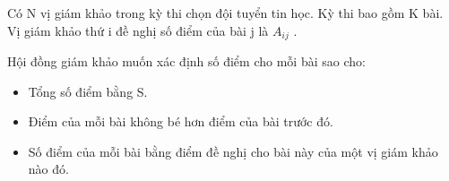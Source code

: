 Có N vị giám khảo trong kỳ thi chọn đội tuyển tin học. Kỳ thi bao gồm K bài. Vị giám khảo thứ i đề nghị số điểm của bài j là $A_{ij}$ .

Hội đồng giám khảo muốn xác định số điểm cho mỗi bài sao cho:
\begin{itemize}
	\item Tổng số điểm bằng S.
	\item Điểm của mỗi bài không bé hơn điểm của bài trước đó.
	\item Số điểm của mỗi bài bằng điểm đề nghị cho bài này của một vị giám khảo nào đó.
\end{itemize}
